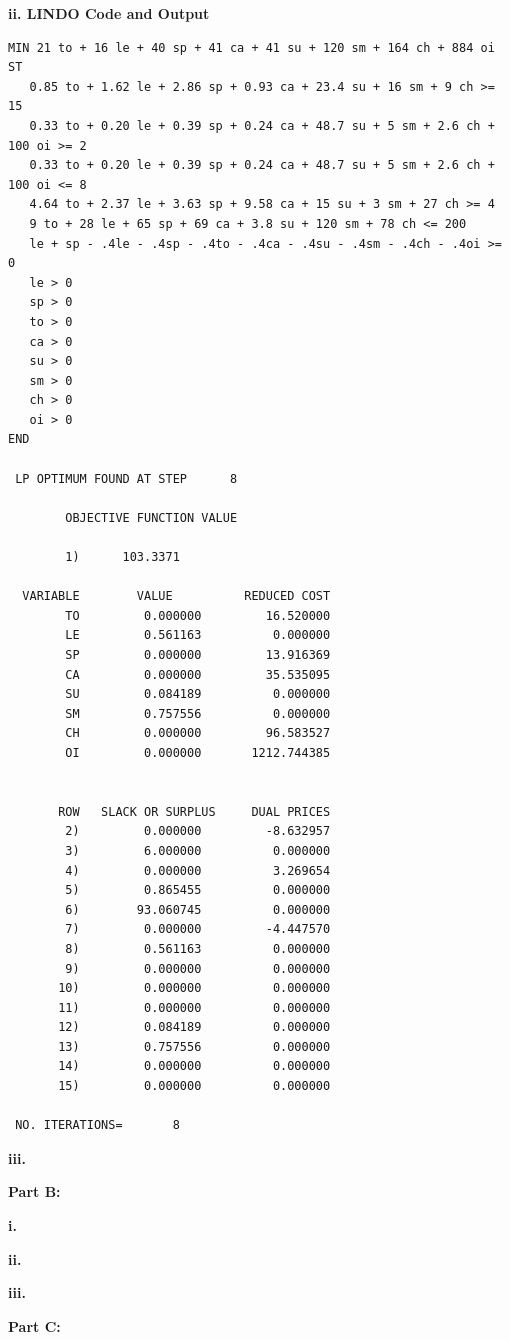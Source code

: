 \documentclass[paper=a4, fontsize=11pt]{scrartcl} %
\numberwithin{equation}{section} %
\numberwithin{figure}{section} %
\numberwithin{table}{section} %
\begin{document}
    \textbf{ii. LINDO Code and Output}
    \begin{verbatim}
MIN 21 to + 16 le + 40 sp + 41 ca + 41 su + 120 sm + 164 ch + 884 oi
ST
   0.85 to + 1.62 le + 2.86 sp + 0.93 ca + 23.4 su + 16 sm + 9 ch >= 15
   0.33 to + 0.20 le + 0.39 sp + 0.24 ca + 48.7 su + 5 sm + 2.6 ch + 100 oi >= 2
   0.33 to + 0.20 le + 0.39 sp + 0.24 ca + 48.7 su + 5 sm + 2.6 ch + 100 oi <= 8
   4.64 to + 2.37 le + 3.63 sp + 9.58 ca + 15 su + 3 sm + 27 ch >= 4
   9 to + 28 le + 65 sp + 69 ca + 3.8 su + 120 sm + 78 ch <= 200
   le + sp - .4le - .4sp - .4to - .4ca - .4su - .4sm - .4ch - .4oi >= 0
   le > 0
   sp > 0
   to > 0
   ca > 0
   su > 0
   sm > 0
   ch > 0
   oi > 0
END

 LP OPTIMUM FOUND AT STEP      8

        OBJECTIVE FUNCTION VALUE

        1)      103.3371

  VARIABLE        VALUE          REDUCED COST
        TO         0.000000         16.520000
        LE         0.561163          0.000000
        SP         0.000000         13.916369
        CA         0.000000         35.535095
        SU         0.084189          0.000000
        SM         0.757556          0.000000
        CH         0.000000         96.583527
        OI         0.000000       1212.744385


       ROW   SLACK OR SURPLUS     DUAL PRICES
        2)         0.000000         -8.632957
        3)         6.000000          0.000000
        4)         0.000000          3.269654
        5)         0.865455          0.000000
        6)        93.060745          0.000000
        7)         0.000000         -4.447570
        8)         0.561163          0.000000
        9)         0.000000          0.000000
       10)         0.000000          0.000000
       11)         0.000000          0.000000
       12)         0.084189          0.000000
       13)         0.757556          0.000000
       14)         0.000000          0.000000
       15)         0.000000          0.000000

 NO. ITERATIONS=       8
    \end{verbatim}
    
    \textbf{iii.}
    
\textbf{Part B:}
    
    \textbf{i.}
    
    \textbf{ii.}
    
    \textbf{iii.}
    
\textbf{Part C:}
	
\end{document}
